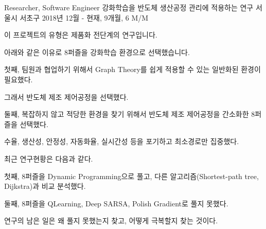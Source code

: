 \begin{cventries}
  \cventry
    {Researcher, Software Engineer} %
    {강화학습을 반도체 생산공정 관리에 적용하는 연구} %
    {서울시 서초구} %
    {2018년 12월 - 현재, 9개월, 6 M/M} %
    {
      \begin{cvitems} %
        \item {이 프로젝트의 유형은 제품화 전단계의 연구입니다.}
        \item {아래와 같은 이유로 8퍼즐을 강화학습 환경으로 선택했습니다.}
        \item {첫째, 팀원과 협업하기 위해서 Graph Theory를 쉽게 적용할 수 있는 일반화된 환경이 필요했다.}
        \item {그래서 반도체 제조 제어공정을 선택했다.}
        \item {둘째, 복잡하지 않고 적당한 환경을 찾기 위해서 반도체 제조 제어공정을 간소화한 8퍼즐을 선택했다.}
        \item {수율, 생산성, 안정성, 자동화율, 실시간성 등을 포기하고 최소경로만 집중했다.}
        \item {최근 연구현황은 다음과 같다.}
        \item {첫째, 8퍼즐을 Dynamic Programming으로 풀고, 다른 알고리즘(Shortest-path tree, Dijkstra)과 비교 분석했다.}
        \item {둘째, 8퍼즐을 QLearning, Deep SARSA, Polish Gradient로 풀지 못했다.}
        \item {연구의 남은 일은 왜 풀지 못했는지 찾고, 어떻게 극복할지 찾는 것이다.}
      \end{cvitems}
    }


\end{cventries}
